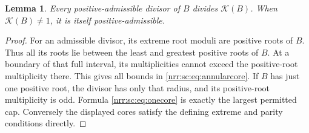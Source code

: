 \documentclass[11pt,letterpaper]{article}
\newtheorem{lemma}[theorem]{Lemma}
\theoremstyle{definition}
\theoremstyle{remark}
\newcommand{\pcore}{\mathcal K}
\begin{document}
\begin{lemma}
\label{nrr:sc:lem:largest-positive}
Every positive-admissible divisor of $B$ divides $\pcore(B)$.
When $\pcore(B)\ne1$, it is itself positive-admissible.
\end{lemma}
\begin{proof}
For an admissible divisor, its extreme root moduli are positive roots
of $B$. Thus all its roots lie between the least and greatest positive
roots of $B$. At a boundary of that full interval, its multiplicities
cannot exceed the positive-root multiplicity there. This gives all bounds
in \eqref{nrr:sc:eq:annularcore}.
If $B$ has just one positive root, the divisor has only that radius,
and its positive-root multiplicity is odd. Formula \eqref{nrr:sc:eq:onecore}
is exactly the largest permitted cap.
Conversely the displayed cores satisfy the defining extreme and parity
conditions directly.
\end{proof}
\end{document}
